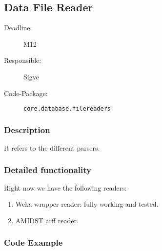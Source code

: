 \newpage
\subsection{Data File Reader}
\label{Functionality:ID}

\begin{description}
\item[Deadline:] M12
\item[Responsible:] Sigve
\item[Code-Package:] \texttt{core.database.filereaders}
\end{description}

\subsubsection*{Description}

It refers to the different parsers. 

\subsubsection*{Detailed functionality}

Right now we have the following readers:

\begin{enumerate}
\item Weka wrapper reader: fully working and tested.
\item AMIDST arff reader.
\end{enumerate}

\subsubsection*{Code Example}

